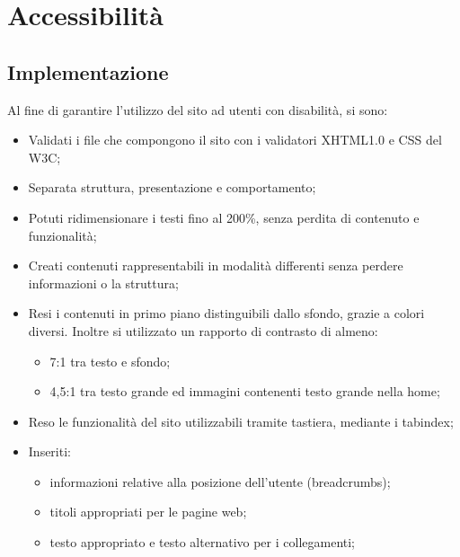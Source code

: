 \section{Accessibilità}{

	\subsection{Implementazione}{
	Al fine di garantire l'utilizzo del sito ad utenti con disabilità, si sono:
	\begin{itemize}\itemsep0.5pt
		\item Validati i file che compongono il sito con i validatori XHTML1.0 e CSS del W3C;
		\item Separata struttura, presentazione e comportamento;
		\item Potuti ridimensionare i testi fino al 200\%, senza perdita di contenuto e funzionalità;
		\item Creati contenuti rappresentabili in modalità differenti senza perdere informazioni o la struttura;  %
		\item Resi i contenuti in primo piano distinguibili dallo sfondo, grazie a colori diversi. Inoltre si utilizzato un rapporto di contrasto di almeno: 
		\begin{itemize}\itemsep1pt
			\item 7:1 tra testo e sfondo;
			\item 4,5:1 tra testo grande ed immagini contenenti testo grande nella home;
		\end{itemize}
		\item Reso le funzionalità del sito utilizzabili tramite tastiera, mediante i tabindex;
		\item Inseriti:
		\begin{itemize}\itemsep0.5pt
			\item informazioni relative alla posizione dell'utente (breadcrumbs); 
			\item titoli appropriati  per le pagine web; 
			\item testo appropriato e testo alternativo per i collegamenti; 

\end{itemize}
\end{itemize}}}
